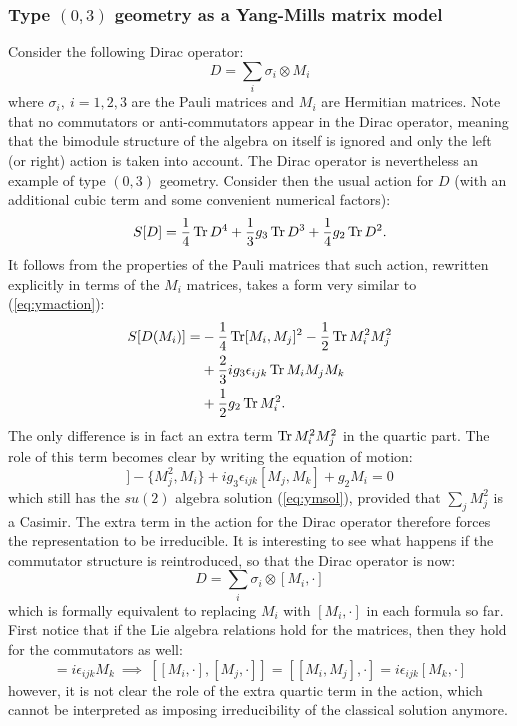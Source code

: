 \subsubsection{Type $(0,3)$ geometry as a Yang-Mills matrix model}
Consider the following Dirac operator:
\begin{equation}
D = \sum_i \sigma_i \otimes M_i
\end{equation}
where $\sigma_i, \ i=1,2,3$ are the Pauli matrices and $M_i$ are Hermitian matrices. Note that no commutators or anti-commutators appear in the Dirac operator, meaning that the bimodule structure of the algebra on itself is ignored and only the left (or right) action is taken into account. The Dirac operator is nevertheless an example of type $(0,3)$ geometry.\newline
Consider then the usual action for $D$ (with an additional cubic term and some convenient numerical factors):
\begin{equation}
S[D] = \frac{1}{4} \operatorname{Tr} D^4 + \frac{1}{3}g_3 \operatorname{Tr} D^3 + \frac{1}{4}g_2 \operatorname{Tr} D^2.
\end{equation}
It follows from the properties of the Pauli matrices that such action, rewritten explicitly in terms of the $M_i$ matrices, takes a form very similar to (\ref{eq:ymaction}):
\begin{align}
S[D(M_i)] = &-\frac{1}{4} \operatorname{Tr} [M_i, M_j]^2 -\frac{1}{2} \operatorname{Tr} M_i^2 M_j^2 \\ \notag
&+ \frac{2}{3} i g_3 \epsilon_{ijk} \operatorname{Tr} M_i M_j M_k \\ \notag
&+ \frac{1}{2} g_2 \operatorname{Tr} M_i^2.
\end{align}
The only difference is in fact an extra term $\operatorname{Tr} M_i^2 M_j^2$ in the quartic part. The role of this term becomes clear by writing the equation of motion:
\begin{equation}
[M_j, [M_j, M_i]] - \{M_j^2, M_i \} + i g_3 \epsilon_{ijk}[M_j, M_k] + g_2 M_i = 0
\end{equation}
which still has the $su(2)$ algebra solution (\ref{eq:ymsol}), provided that $\sum_j M_j^2$ is a Casimir. The extra term in the action for the Dirac operator therefore forces the representation to be irreducible.\newline
It is interesting to see what happens if the commutator structure is reintroduced, so that the Dirac operator is now:
\begin{equation}
D = \sum_i \sigma_i \otimes [M_i,\cdot ]
\end{equation}
which is formally equivalent to replacing $M_i$ with $[M_i, \cdot ]$ in each formula so far. First notice that if the Lie algebra relations hold for the matrices, then they hold for the commutators as well:
\begin{equation}
[M_i, M_j] = i \epsilon_{ijk} M_k \ \implies \ [[M_i, \cdot ], [M_j, \cdot ]] = [[M_i, M_j], \cdot ] = i \epsilon_{ijk} [M_k, \cdot ]
\end{equation}
however, it is not clear the role of the extra quartic term in the action, which cannot be interpreted as imposing irreducibility of the classical solution anymore.



